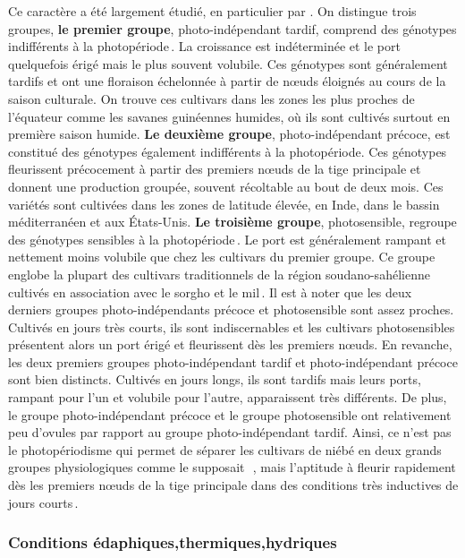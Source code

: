 \documentclass[a4paper,11pt]{article}
\begin{document}
Ce caractère a été largement étudié, en particulier
par\,\citeauthor{Steele_1972}\,\citeyear{Steele_1972}. On distingue
trois groupes, \textbf{le premier groupe}, photo-indépendant tardif,
comprend des génotypes indifférents à la
photopériode\,\cite{IITA_2008}. La croissance est indéterminée et le
port quelquefois érigé mais le plus souvent volubile. Ces génotypes
sont généralement tardifs et ont une floraison échelonnée à partir de
nœuds éloignés au cours de la saison culturale. On trouve ces
cultivars dans les zones les plus proches de l'équateur comme les
savanes guinéennes humides, où ils sont cultivés surtout en première
saison humide. \textbf{Le deuxième groupe}, photo-indépendant précoce,
est constitué des génotypes également indifférents à la
photopériode. Ces génotypes fleurissent précocement à partir des
premiers nœuds de la tige principale et donnent une production
groupée, souvent récoltable au bout de deux mois. Ces variétés sont
cultivées dans les zones de latitude élevée, en Inde, dans le bassin
méditerranéen et aux États-Unis. \textbf{Le troisième groupe},
photosensible, regroupe des génotypes sensibles à la
photopériode\,\cite{Steele_1972}. Le port est généralement rampant et
nettement moins volubile que chez les cultivars du premier groupe. Ce
groupe englobe la plupart des cultivars traditionnels de la région
soudano-sahélienne cultivés en association avec le sorgho et le
mil\,\cite{Doggett_1988}. Il est à noter que les deux derniers groupes
photo-indépendants précoce et photosensible sont assez
proches. Cultivés en jours très courts, ils sont indiscernables et les
cultivars photosensibles présentent alors un port érigé et fleurissent
dès les premiers nœuds. En revanche, les deux premiers groupes
photo-indépendant tardif et photo-indépendant précoce sont bien
distincts. Cultivés en jours longs, ils sont tardifs mais leurs ports,
rampant pour l'un et volubile pour l'autre, apparaissent très
différents. De plus, le groupe photo-indépendant précoce et le groupe
photosensible ont relativement peu d'ovules par rapport au groupe
photo-indépendant tardif. Ainsi, ce n'est pas le photopériodisme qui
permet de séparer les cultivars de niébé en deux grands groupes
physiologiques comme le supposait
\,\citeauthor{Steele_1972}\,\citeyear{Steele_1972}, mais l'aptitude à
fleurir rapidement dès les premiers nœuds de la tige principale dans
des conditions très inductives de jours
courts\,\cite{IITA_2008}.

\subsubsection{Conditions édaphiques,thermiques,hydriques}
\end{document}
